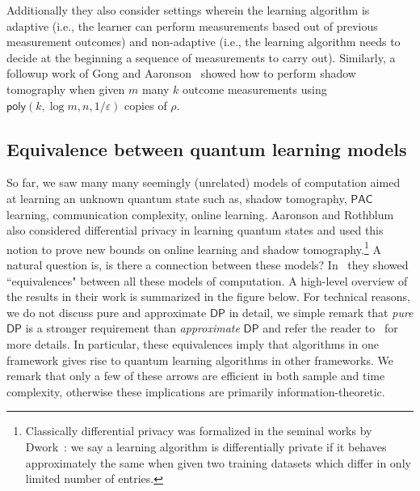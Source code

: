 \documentclass[11pt]{article}
\newcommand{\poly}{\ensuremath{\mathsf{poly}}}
\newcommand{\sfat}{\ensuremath{\mathsf{sfat}}}
\newcommand{\DP}{\ensuremath{\mathsf{DP}}}
\newcommand{\PAC}{\ensuremath{\mathsf{PAC}}}
\begin{document}
Additionally they also consider settings wherein the learning algorithm is adaptive (i.e., the learner can perform measurements based out of previous measurement outcomes) and non-adaptive (i.e., the learning algorithm needs to decide at the beginning a sequence of measurements to carry out). Similarly, a followup work of Gong and Aaronson~\cite{gong2022learning} showed how to perform shadow tomography when given $m$ many $k$ outcome measurements using $\poly(k,\log m,n,1/\varepsilon)$ copies of $\rho$.


\subsection{Equivalence between quantum learning models}

So far, we saw many many seemingly (unrelated) models of computation aimed at learning an unknown quantum state such as, shadow tomography, $\PAC$ learning, communication complexity, online learning.  Aaronson and Rothblum~\cite{aaronson2019gentle} also considered differential privacy in learning quantum states and used this notion to prove new bounds on online learning and shadow tomography.\footnote{Classically differential privacy was formalized in the seminal works by Dwork~\cite{dwork2006differential,dwork2014algorithmic}: we say a learning algorithm is differentially private if it behaves approximately the same when given two training datasets which differ in only limited number of entries.} A natural question is, is there a connection between these models? In~\cite{DBLP:conf/nips/QuekAS21} they showed ``equivalences" between all these models of computation.  A high-level overview of the results in their work is summarized in the figure below. For technical reasons, we do not discuss pure and approximate $\DP$ in detail,  we simple remark that \emph{pure} $\DP$ is a stronger requirement than \emph{approximate} $\DP$ and refer the reader to~\cite{DBLP:conf/nips/QuekAS21} for more details. In particular, these equivalences imply that algorithms in one framework gives rise to quantum learning algorithms in other frameworks.
 We remark that only a few of these arrows are efficient in both sample and time complexity, otherwise these implications are primarily information-theoretic. 
\end{document}
